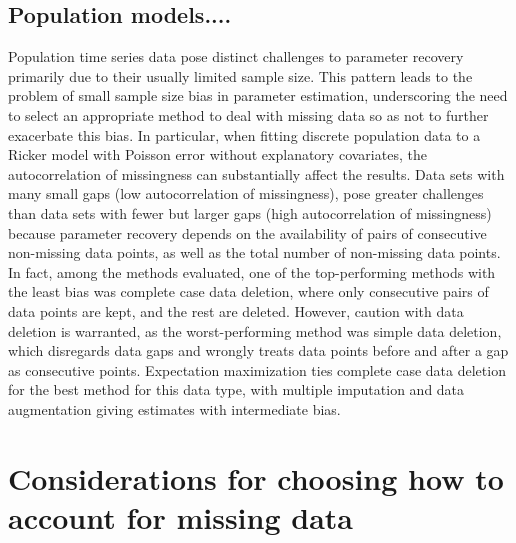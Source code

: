 

 \subsection*{Population models....}
 
Population time series data pose distinct challenges to parameter recovery primarily due to their usually limited sample size. This pattern leads to the problem of small sample size bias in parameter estimation, underscoring the need to select an appropriate method to deal with missing data so as not to further exacerbate this bias. In particular, when fitting discrete population data to a Ricker model with Poisson error without explanatory covariates, the autocorrelation of missingness can substantially affect the results. Data sets with many small gaps (low autocorrelation of missingness), pose greater challenges than data sets with fewer but larger gaps (high autocorrelation of missingness) because parameter recovery depends on the availability of pairs of consecutive non-missing data points, as well as the total number of non-missing data points. In fact, among the methods evaluated, one of the top-performing methods with the least bias was complete case data deletion, where only consecutive pairs of data points are kept, and the rest are deleted. However, caution with data deletion is warranted, as the worst-performing method was simple data deletion, which disregards data gaps and wrongly treats data points before and after a gap as consecutive points. Expectation maximization ties complete case data deletion for the best method for this data type, with multiple imputation and data augmentation giving estimates with intermediate bias.



\section*{Considerations for choosing how to account for missing data}

